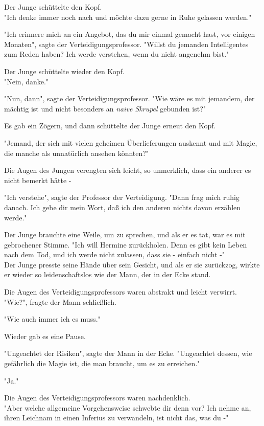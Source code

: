 {Der Junge schüttelte den Kopf.\\ "Ich denke immer noch nach und möchte dazu gerne in Ruhe gelassen werden."

"Ich erinnere mich an ein Angebot, das du mir einmal gemacht hast, vor einigen Monaten", sagte der Verteidigungsprofessor. "Willst du jemanden Intelligentes zum Reden haben? Ich werde verstehen, wenn du nicht angenehm bist."

Der Junge schüttelte wieder den Kopf.\\ "Nein, danke."

"Nun, dann", sagte der Verteidigungsprofessor. "Wie wäre es mit jemandem, der mächtig ist und nicht besonders an \emph{naive Skrupel} gebunden ist?"

Es gab ein Zögern, und dann schüttelte der Junge erneut den Kopf.

"Jemand, der sich mit vielen geheimen Überlieferungen auskennt und mit Magie, die manche als unnatürlich ansehen könnten?"

Die Augen des Jungen verengten sich leicht, so unmerklich, dass ein anderer es nicht bemerkt hätte -

"Ich verstehe", sagte der Professor der Verteidigung. "Dann frag mich ruhig danach. Ich gebe dir mein Wort, daß ich den anderen nichts davon erzählen werde."

Der Junge brauchte eine Weile, um zu sprechen, und als er es tat, war es mit gebrochener Stimme. "Ich will Hermine zurückholen. Denn es gibt kein Leben nach dem Tod, und ich werde nicht zulassen, dass sie - einfach nicht -"\\ Der Junge presste seine Hände über sein Gesicht, und als er sie zurückzog, wirkte er wieder so leidenschaftslos wie der Mann, der in der Ecke stand.

Die Augen des Verteidigungsprofessors waren abstrakt und leicht verwirrt.\\ "Wie?", fragte der Mann schließlich.

"Wie auch immer ich es muss."

Wieder gab es eine Pause.

"Ungeachtet der Risiken", sagte der Mann in der Ecke. "Ungeachtet dessen, wie gefährlich die Magie ist, die man braucht, um es zu erreichen."

"Ja."

Die Augen des Verteidigungsprofessors waren nachdenklich.\\ "Aber welche allgemeine Vorgehensweise schwebte dir denn vor? Ich nehme an, ihren Leichnam in einen Inferius zu verwandeln, ist nicht das, was du -"

}
